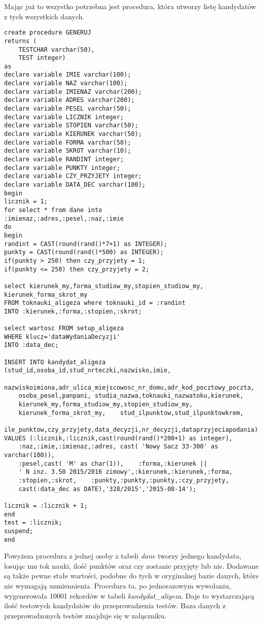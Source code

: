 Mając już to wszystko potrzebna jest procedura, która utworzy listę kandydatów z tych wszystkich danych. 

\begin{lstlisting}
create procedure GENERUJ
returns (
    TESTCHAR varchar(50),
    TEST integer)
as
declare variable IMIE varchar(100);
declare variable NAZ varchar(100);
declare variable IMIENAZ varchar(200);
declare variable ADRES varchar(200);
declare variable PESEL varchar(50);
declare variable LICZNIK integer;
declare variable STOPIEN varchar(50);
declare variable KIERUNEK varchar(50);
declare variable FORMA varchar(50);
declare variable SKROT varchar(10);
declare variable RANDINT integer;
declare variable PUNKTY integer;
declare variable CZY_PRZYJETY integer;
declare variable DATA_DEC varchar(100);
begin
licznik = 1;
for select * from dane into
:imienaz,:adres,:pesel,:naz,:imie
do
begin
randint = CAST(round(rand()*7+1) as INTEGER);
punkty = CAST(round(rand()*500) as INTEGER);
if(punkty > 250) then czy_przyjety = 1;
if(punkty <= 250) then czy_przyjety = 2;

select kierunek_my,forma_studiow_my,stopien_studiow_my,
kierunek_forma_skrot_my
FROM toknauki_aligeza where toknauki_id = :randint
INTO :kierunek,:forma,:stopien,:skrot;

select wartosc FROM setup_aligeza 
WHERE klucz='dataWydaniaDecyzji'
INTO :data_dec;

INSERT INTO kandydat_aligeza (stud_id,osoba_id,stud_nrteczki,nazwisko,imie,
	nazwiskoimiona,adr_ulica_miejscowosc_nr_domu,adr_kod_pocztowy_poczta,
	osoba_pesel,panpani, studia_nazwa,toknauki_nazwatoku,kierunek, 
	kierunek_my,forma_studiow_my,stopien_studiow_my,
	kierunek_forma_skrot_my,    stud_ilpunktow,stud_ilpunktowkrem,
	ile_punktow,czy_przyjety,data_decyzji,nr_decyzji,dataprzyjeciapodania)
VALUES (:licznik,:licznik,cast(round(rand()*200+1) as integer),
	:naz,:imie,:imienaz,:adres, cast( 'Nowy Sacz 33-300' as varchar(100)),
	:pesel,cast( 'M' as char(1)),    :forma,:kierunek || 
	' N inz. 3.50 2015/2016 zimowy',:kierunek,:kierunek,:forma,
	:stopien,:skrot,    :punkty,:punkty,:punkty,:czy_przyjety,
	cast(:data_dec as DATE),'328/2015','2015-08-14');

licznik = :licznik + 1;
end
test = :licznik;
suspend;
end
\end{lstlisting}
Powyższa procedura z jednej osoby z tabeli \emph{dane} tworzy jednego kandydata, losując mu tok nauki, ilość punktów oraz czy zostanie przyjęty lub nie. Dodawane są także pewne stałe wartości, podobne do tych w oryginalnej bazie danych, które nie wymagają uzmiennienia. Procedura ta, po jednorazowym wywołaniu, wygenerowała 10001 rekordów w tabeli \emph{kandydat\_aligeza}. Daje to wystarczającą ilość testowych kandydatów do przeprowadzenia testów. Baza danych z przeprowadzonych testów znajduje się w załączniku.

